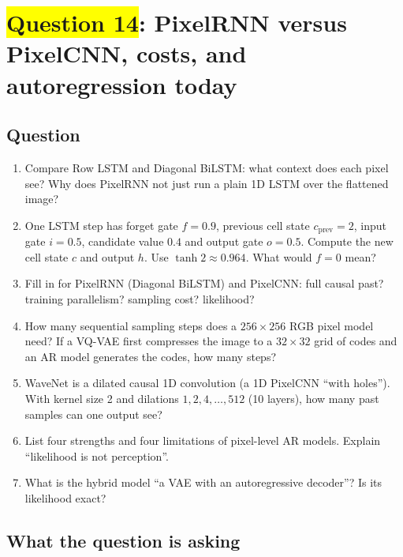\documentclass[12pt,a4paper]{article}
\begin{document}
\section{\texorpdfstring{\colorbox{yellow}{Question 14}}{Question 14}: PixelRNN versus PixelCNN, costs, and autoregression today}

\subsection{Question}

\begin{enumerate}[label=(\alph*)]
  \item[\colorbox{yellow}{(a)}] Compare Row LSTM and Diagonal BiLSTM: what context does each pixel see? Why does PixelRNN not just run a plain 1D LSTM over the flattened image?
  \item[\colorbox{yellow}{(b)}] One LSTM step has forget gate $f=0.9$, previous cell state $c_{\text{prev}}=2$, input gate $i=0.5$, candidate value $0.4$ and output gate $o=0.5$. Compute the new cell state $c$ and output $h$. Use $\tanh2\approx0.964$. What would $f=0$ mean?
  \item[\colorbox{yellow}{(c)}] Fill in for PixelRNN (Diagonal BiLSTM) and PixelCNN: full causal past? training parallelism? sampling cost? likelihood?
  \item How many sequential sampling steps does a $256\times256$ RGB pixel model need? If a VQ-VAE first compresses the image to a $32\times32$ grid of codes and an AR model generates the codes, how many steps?
  \item[\colorbox{yellow}{(e)}] WaveNet is a dilated causal 1D convolution (a 1D PixelCNN ``with holes''). With kernel size 2 and dilations $1,2,4,\dots,512$ (10 layers), how many past samples can one output see?
  \item[\colorbox{yellow}{(f)}] List four strengths and four limitations of pixel-level AR models. Explain ``likelihood is not perception''.
  \item What is the hybrid model ``a VAE with an autoregressive decoder''? Is its likelihood exact?
\end{enumerate}

\subsection{What the question is asking}
\end{document}
